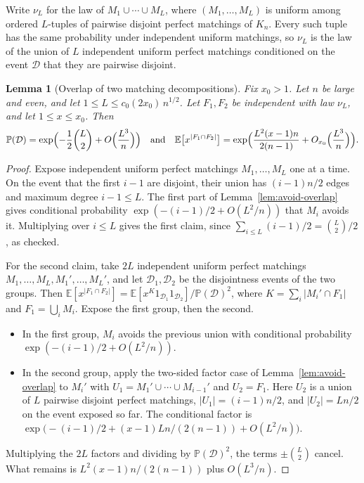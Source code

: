 \documentclass[11pt]{article}
\newtheorem{lemma}[theorem]{Lemma}
\newcommand{\EE}{\mathbb{E}}
\newcommand{\PP}{\mathbb{P}}
\begin{document}
Write \(\nu_L\) for the law of \(M_1\cup\cdots\cup M_L\), where
\((M_1,\ldots,M_L)\) is uniform among ordered \(L\)-tuples of pairwise
disjoint perfect matchings of \(K_n\).
Every such tuple has the same probability under independent uniform
matchings, so \(\nu_L\) is the law of the union of \(L\) independent uniform
perfect matchings conditioned on the event \(\mathcal D\) that they are
pairwise disjoint.

\begin{lemma}[Overlap of two matching decompositions]
\label{lem:decomp-overlap}
Fix \(x_0>1\). Let \(n\) be large and even, and let
\(1\le L\le c_0(2x_0)\,n^{1/2}\).
Let \(F_1,F_2\) be independent with law \(\nu_L\), and let \(1\le x\le x_0\).
Then
\[
\PP(\mathcal D)=\exp\Bigl(-\frac12\binom L2+O\Bigl(\frac{L^3}{n}\Bigr)\Bigr)
\quad\text{and}\quad
\EE\bigl[x^{|F_1\cap F_2|}\bigr]
=
\exp\Bigl(\frac{L^2(x-1)n}{2(n-1)}+O_{x_0}\Bigl(\frac{L^3}{n}\Bigr)\Bigr).
\]
\end{lemma}

\begin{proof}
Expose independent uniform perfect matchings \(M_1,\ldots,M_L\) one at a time.
On the event that the first \(i-1\) are disjoint, their union has
\((i-1)n/2\) edges and maximum degree \(i-1\le L\).
The first part of Lemma~\ref{lem:avoid-overlap} gives conditional
probability \(\exp(-(i-1)/2+O(L^2/n))\) that \(M_i\) avoids it.
Multiplying over \(i\le L\) gives the first claim, since
\(\sum_{i\le L}(i-1)/2=\binom L2/2\), as checked.

For the second claim, take \(2L\) independent uniform perfect matchings
\(M_1,\ldots,M_L,M_1',\ldots,M_L'\), and let \(\mathcal D_1,\mathcal D_2\) be
the disjointness events of the two groups.
Then \(\EE[x^{|F_1\cap F_2|}]=\EE[x^{K}1_{\mathcal D_1}1_{\mathcal D_2}]/\PP(\mathcal D)^2\),
where \(K=\sum_i|M_i'\cap F_1|\) and \(F_1=\bigcup_iM_i\).
Expose the first group, then the second.
\begin{itemize}
\item In the first group, \(M_i\) avoids the previous union with conditional
probability \(\exp(-(i-1)/2+O(L^2/n))\).
\item In the second group, apply the two-sided factor case of
Lemma~\ref{lem:avoid-overlap} to \(M_i'\) with \(U_1=M_1'\cup\cdots\cup M_{i-1}'\)
and \(U_2=F_1\). Here \(U_2\) is a union of \(L\) pairwise disjoint perfect
matchings, \(|U_1|=(i-1)n/2\), and \(|U_2|=Ln/2\) on the event exposed so
far. The conditional factor is
\(\exp\bigl(-(i-1)/2+(x-1)Ln/(2(n-1))+O(L^2/n)\bigr)\).
\end{itemize}
Multiplying the \(2L\) factors and dividing by \(\PP(\mathcal D)^2\), the terms
\(\pm\binom L2\) cancel. What remains is
\(L^2(x-1)n/(2(n-1))\) plus \(O(L^3/n)\).
\end{proof}
\end{document}
